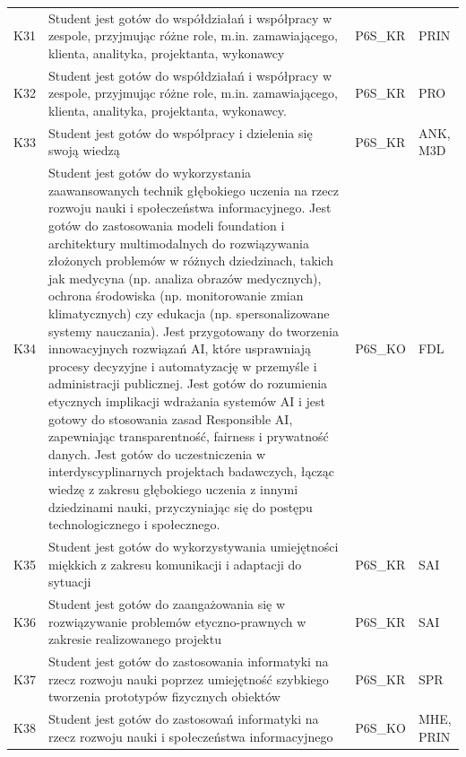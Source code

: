 \documentclass[12pt,a4paper]{article}
\begin{document}
{\begin{longtable}{m{1cm}m{8.8cm}m{2.1cm}m{2.5cm}}
\rowcolor{tableRowLight} K31 & Student jest gotów do współdziałań i współpracy w zespole, przyjmując różne role, m.in. zamawiającego, klienta, analityka, projektanta, wykonawcy & {\scriptsize P6S\_KR} & {\scriptsize PRIN} \\
\rowcolor{tableRowAlt} K32 & Student jest gotów do współdziałań i współpracy w zespole, przyjmując różne role, m.in. zamawiającego, klienta, analityka, projektanta, wykonawcy. & {\scriptsize P6S\_KR} & {\scriptsize PRO} \\
\rowcolor{tableRowLight} K33 & Student jest gotów do współpracy i dzielenia się swoją wiedzą & {\scriptsize P6S\_KR} & {\scriptsize ANK, M3D} \\
\rowcolor{tableRowAlt} K34 & Student jest gotów do wykorzystania zaawansowanych technik głębokiego uczenia na rzecz rozwoju nauki i społeczeństwa informacyjnego. Jest gotów do zastosowania modeli foundation i architektury multimodalnych do rozwiązywania złożonych problemów w różnych dziedzinach, takich jak medycyna (np. analiza obrazów medycznych), ochrona środowiska (np. monitorowanie zmian klimatycznych) czy edukacja (np. spersonalizowane systemy nauczania). Jest przygotowany do tworzenia innowacyjnych rozwiązań AI, które usprawniają procesy decyzyjne i automatyzację w przemyśle i administracji publicznej. Jest gotów do rozumienia etycznych implikacji wdrażania systemów AI i jest gotowy do stosowania zasad Responsible AI, zapewniając transparentność, fairness i prywatność danych. Jest gotów do uczestniczenia w interdyscyplinarnych projektach badawczych, łącząc wiedzę z zakresu głębokiego uczenia z innymi dziedzinami nauki, przyczyniając się do postępu technologicznego i społecznego. & {\scriptsize P6S\_KO} & {\scriptsize FDL} \\
\rowcolor{tableRowLight} K35 & Student jest gotów do wykorzystywania umiejętności miękkich z zakresu komunikacji i adaptacji do sytuacji & {\scriptsize P6S\_KR} & {\scriptsize SAI} \\
\rowcolor{tableRowAlt} K36 & Student jest gotów do zaangażowania się w rozwiązywanie problemów etyczno-prawnych w zakresie realizowanego projektu & {\scriptsize P6S\_KR} & {\scriptsize SAI} \\
\rowcolor{tableRowLight} K37 & Student jest gotów do zastosowania informatyki na rzecz rozwoju nauki poprzez umiejętność szybkiego tworzenia prototypów fizycznych obiektów & {\scriptsize P6S\_KR} & {\scriptsize SPR} \\
\rowcolor{tableRowAlt} K38 & Student jest gotów do zastosowań informatyki na rzecz rozwoju nauki i społeczeństwa informacyjnego & {\scriptsize P6S\_KO} & {\scriptsize MHE, PRIN} \\

\end{longtable}}
\end{document}
